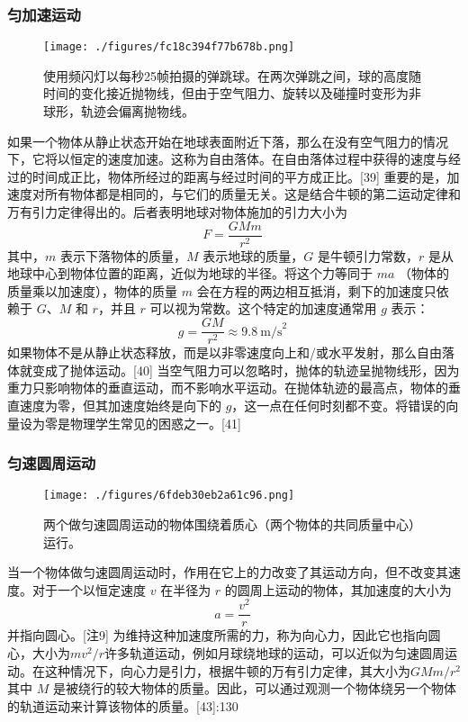 \subsubsection{匀加速运动} 
\begin{figure}[ht]
\centering
\texttt{[image: ./figures/fc18c394f77b678b.png]}
\caption{使用频闪灯以每秒25帧拍摄的弹跳球。在两次弹跳之间，球的高度随时间的变化接近抛物线，但由于空气阻力、旋转以及碰撞时变形为非球形，轨迹会偏离抛物线。} \label{fig_NEW01_4}
\end{figure}
如果一个物体从静止状态开始在地球表面附近下落，那么在没有空气阻力的情况下，它将以恒定的速度加速。这称为自由落体。在自由落体过程中获得的速度与经过的时间成正比，物体所经过的距离与经过时间的平方成正比。[39] 重要的是，加速度对所有物体都是相同的，与它们的质量无关。这是结合牛顿的第二运动定律和万有引力定律得出的。后者表明地球对物体施加的引力大小为
\[
F = \frac{GMm}{r^2}~
\]
其中，\( m \) 表示下落物体的质量，\( M \) 表示地球的质量，\( G \) 是牛顿引力常数，\( r \) 是从地球中心到物体位置的距离，近似为地球的半径。将这个力等同于 \( ma \) （物体的质量乘以加速度），物体的质量 \( m \) 会在方程的两边相互抵消，剩下的加速度只依赖于 \( G \)、\( M \) 和 \( r \)，并且 \( r \) 可以视为常数。这个特定的加速度通常用 \( g \) 表示：
\[
g = \frac{GM}{r^2} \approx 9.8~\text{m/s}^2~
\]
如果物体不是从静止状态释放，而是以非零速度向上和/或水平发射，那么自由落体就变成了抛体运动。[40] 当空气阻力可以忽略时，抛体的轨迹呈抛物线形，因为重力只影响物体的垂直运动，而不影响水平运动。在抛体轨迹的最高点，物体的垂直速度为零，但其加速度始终是向下的 \( g \)，这一点在任何时刻都不变。将错误的向量设为零是物理学生常见的困惑之一。[41]
\subsubsection{匀速圆周运动} 
\begin{figure}[ht]
\centering
\texttt{[image: ./figures/6fdeb30eb2a61c96.png]}
\caption{两个做匀速圆周运动的物体围绕着质心（两个物体的共同质量中心）运行。} \label{fig_NEW01_5}
\end{figure}
当一个物体做匀速圆周运动时，作用在它上的力改变了其运动方向，但不改变其速度。对于一个以恒定速度 \( v \) 在半径为 \( r \) 的圆周上运动的物体，其加速度的大小为
\[
a = \frac{v^2}{r}~
\]
并指向圆心。[注9] 为维持这种加速度所需的力，称为向心力，因此它也指向圆心，大小为\(mv^2/r\)许多轨道运动，例如月球绕地球的运动，可以近似为匀速圆周运动。在这种情况下，向心力是引力，根据牛顿的万有引力定律，其大小为\(GMm/r^2\)其中 \( M \) 是被绕行的较大物体的质量。因此，可以通过观测一个物体绕另一个物体的轨道运动来计算该物体的质量。[43]:130

